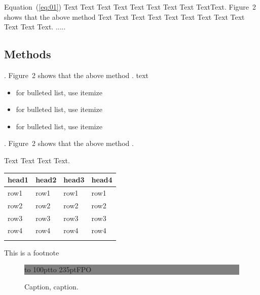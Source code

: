 \documentclass{bioinfo}
\begin{document}
Equation~(\ref{eq:01}) Text Text Text Text Text Text  Text Text
TextText.
Figure~2\vphantom{\ref{fig:02}} shows that the above method  Text
Text Text Text  Text Text Text Text Text Text  Text Text.
.....


\begin{methods}
\section{Methods}
  .
Figure~2\vphantom{\ref{fig:02}} shows that the above method   .
text\vspace*{1pt}

\begin{itemize}
\item for bulleted list, use itemize
\item for bulleted list, use itemize
\item for bulleted list, use itemize\vspace*{1pt}
\end{itemize}
  .
Figure~2\vphantom{\ref{fig:02}} shows that the above method   .


\enlargethispage{6pt}
Text Text  Text Text.

\begin{table}[!t]
 {\begin{tabular}{@{}llll@{}}\toprule head1 &
head2 & head3 & head4\\\midrule
row1 & row1 & row1 & row1\\
row2 & row2 & row2 & row2\\
row3 & row3 & row3 & row3\\
row4 & row4 & row4 & row4\\\botrule
\end{tabular}}{This is a footnote}
\end{table}

\end{methods}

\begin{figure}[!tpb]%
\fboxsep=0pt\colorbox{gray}{\begin{minipage}[t]{235pt} \vbox to 100pt{\vfill\hbox to
235pt{\hfill\fontsize{24pt}{24pt}\selectfont FPO\hfill}\vfill}
\end{minipage}}
\caption{Caption, caption.}\label{fig:01}
\end{figure}

\end{document}
